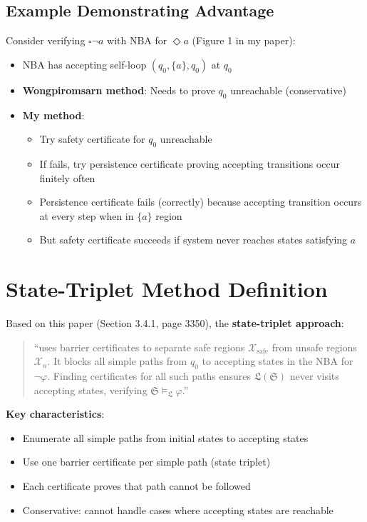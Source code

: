 \documentclass{article}
\begin{document}
\subsection{Example Demonstrating Advantage}

Consider verifying $\square \neg a$ with NBA for $\Diamond a$ (Figure 1 in my paper):
\begin{itemize}
    \item NBA has accepting self-loop $(q_0, \{a\}, q_0)$ at $q_0$
    \item \textbf{Wongpiromsarn method}: Needs to prove $q_0$ unreachable (conservative)
    \item \textbf{My method}:
    \begin{itemize}
        \item Try safety certificate for $q_0$ unreachable
        \item If fails, try persistence certificate proving accepting transitions occur finitely often
        \item Persistence certificate fails (correctly) because accepting transition occurs at every step when in $\{a\}$ region
        \item But safety certificate succeeds if system never reaches states satisfying $a$
    \end{itemize}
\end{itemize}

\section{State-Triplet Method Definition}

Based on this paper (Section 3.4.1, page 3350), the \textbf{state-triplet approach}:

\begin{quote}
``uses barrier certificates to separate safe regions $\mathcal{X}_{\text{safe}}$ from unsafe regions $\mathcal{X}_u$. It blocks all simple paths from $q_0$ to accepting states in the NBA for $\neg\varphi$. Finding certificates for all such paths ensures $\mathfrak{L}(\mathfrak{S})$ never visits accepting states, verifying $\mathfrak{S} \models_\mathfrak{L} \varphi$.''
\end{quote}

\textbf{Key characteristics}:
\begin{itemize}
    \item Enumerate all simple paths from initial states to accepting states
    \item Use one barrier certificate per simple path (state triplet)
    \item Each certificate proves that path cannot be followed
    \item Conservative: cannot handle cases where accepting states are reachable
\end{itemize}
\end{document}
